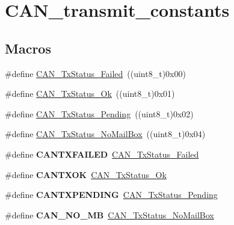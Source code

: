 \hypertarget{group___c_a_n__transmit__constants}{\section{C\-A\-N\-\_\-transmit\-\_\-constants}
\label{group___c_a_n__transmit__constants}
}
\subsection*{Macros}
\begin{DoxyCompactItemize}
\item 
\#define \hyperlink{group___c_a_n__transmit__constants_ga8d193002e76c04ec8caff6b110cd5983}{C\-A\-N\-\_\-\-Tx\-Status\-\_\-\-Failed}~((uint8\-\_\-t)0x00)
\item 
\#define \hyperlink{group___c_a_n__transmit__constants_ga0b401c61922b1449de9b486dcf475c97}{C\-A\-N\-\_\-\-Tx\-Status\-\_\-\-Ok}~((uint8\-\_\-t)0x01)
\item 
\#define \hyperlink{group___c_a_n__transmit__constants_ga9678a3a51379422868083608c7394409}{C\-A\-N\-\_\-\-Tx\-Status\-\_\-\-Pending}~((uint8\-\_\-t)0x02)
\item 
\#define \hyperlink{group___c_a_n__transmit__constants_ga2620e99debd51011d3569121f2e44690}{C\-A\-N\-\_\-\-Tx\-Status\-\_\-\-No\-Mail\-Box}~((uint8\-\_\-t)0x04)
\item 
\hypertarget{group___c_a_n__transmit__constants_ga3590356d92f1a328dc794ac1f07d57d5}{\#define {\bfseries C\-A\-N\-T\-X\-F\-A\-I\-L\-E\-D}~\hyperlink{group___c_a_n__transmit__constants_ga8d193002e76c04ec8caff6b110cd5983}{C\-A\-N\-\_\-\-Tx\-Status\-\_\-\-Failed}}\label{group___c_a_n__transmit__constants_ga3590356d92f1a328dc794ac1f07d57d5}

\item 
\hypertarget{group___c_a_n__transmit__constants_ga288ba42cf1de7572f2fe1378268c9452}{\#define {\bfseries C\-A\-N\-T\-X\-O\-K}~\hyperlink{group___c_a_n__transmit__constants_ga0b401c61922b1449de9b486dcf475c97}{C\-A\-N\-\_\-\-Tx\-Status\-\_\-\-Ok}}\label{group___c_a_n__transmit__constants_ga288ba42cf1de7572f2fe1378268c9452}

\item 
\hypertarget{group___c_a_n__transmit__constants_ga76f43f4c54505b1f87b39b056ca38897}{\#define {\bfseries C\-A\-N\-T\-X\-P\-E\-N\-D\-I\-N\-G}~\hyperlink{group___c_a_n__transmit__constants_ga9678a3a51379422868083608c7394409}{C\-A\-N\-\_\-\-Tx\-Status\-\_\-\-Pending}}\label{group___c_a_n__transmit__constants_ga76f43f4c54505b1f87b39b056ca38897}

\item 
\hypertarget{group___c_a_n__transmit__constants_ga418f1fd7ca2e852b263fd07874fde0c6}{\#define {\bfseries C\-A\-N\-\_\-\-N\-O\-\_\-\-M\-B}~\hyperlink{group___c_a_n__transmit__constants_ga2620e99debd51011d3569121f2e44690}{C\-A\-N\-\_\-\-Tx\-Status\-\_\-\-No\-Mail\-Box}}\label{group___c_a_n__transmit__constants_ga418f1fd7ca2e852b263fd07874fde0c6}

\end{DoxyCompactItemize}


